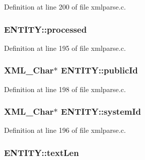 Definition at line 200 of file xmlparse.\+c.

\subsubsection[{\texorpdfstring{processed}{processed}}]{ E\+N\+T\+I\+T\+Y\+::processed}\hypertarget{struct_e_n_t_i_t_y_a5652817ed5b28294c66eb7f04ac9fc9d}{}\label{struct_e_n_t_i_t_y_a5652817ed5b28294c66eb7f04ac9fc9d}


Definition at line 195 of file xmlparse.\+c.

\subsubsection[{\texorpdfstring{public\+Id}{publicId}}]{ {\bf X\+M\+L\+\_\+\+Char}$\ast$ E\+N\+T\+I\+T\+Y\+::public\+Id}\hypertarget{struct_e_n_t_i_t_y_a5790026218864599e3611846122f443f}{}\label{struct_e_n_t_i_t_y_a5790026218864599e3611846122f443f}


Definition at line 198 of file xmlparse.\+c.

\subsubsection[{\texorpdfstring{system\+Id}{systemId}}]{ {\bf X\+M\+L\+\_\+\+Char}$\ast$ E\+N\+T\+I\+T\+Y\+::system\+Id}\hypertarget{struct_e_n_t_i_t_y_a8b74ccc447469b367cfbea8fffe51077}{}\label{struct_e_n_t_i_t_y_a8b74ccc447469b367cfbea8fffe51077}


Definition at line 196 of file xmlparse.\+c.

\subsubsection[{\texorpdfstring{text\+Len}{textLen}}]{ E\+N\+T\+I\+T\+Y\+::text\+Len}\hypertarget{struct_e_n_t_i_t_y_ac57e7c56dbcf23ae36045f2825820c02}{}\label{struct_e_n_t_i_t_y_ac57e7c56dbcf23ae36045f2825820c02}


